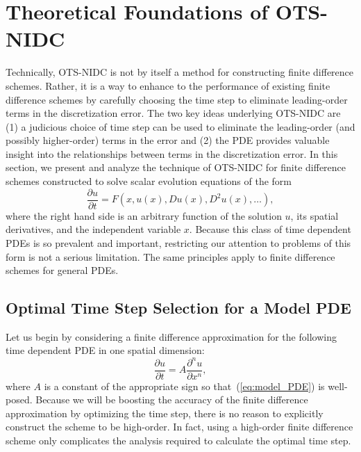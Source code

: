 \documentclass[fleqn,12pt,twoside]{article}
\newcommand{\beq}{\begin{equation}}
\newcommand{\eeq}{\end{equation}}
\begin{document}
\section{\label{sec:OTS-NIDC} Theoretical Foundations of OTS-NIDC}
Technically, OTS-NIDC is not by itself a method for constructing finite
difference schemes.  Rather, it is a way to enhance to the performance of
existing finite difference schemes by carefully choosing the time step to
eliminate leading-order terms in the discretization error.  The two key ideas
underlying OTS-NIDC are 
(1) a judicious choice of time step can be used to eliminate the leading-order 
(and possibly higher-order) terms in the error
and
(2) the PDE provides valuable insight into the relationships between terms
in the discretization error. 
In this section, we present and analyze the technique of OTS-NIDC for
finite difference schemes constructed to solve scalar evolution equations of
the form 
\beq
  \frac{\partial u}{\partial t} = 
    F\left(x, u(x), D u(x), D^2 u(x), \ldots \right), 
\eeq
where the right hand side is an arbitrary function of the solution $u$, its 
spatial derivatives, and the independent variable $x$.
Because this class of time dependent PDEs is so prevalent and important, 
restricting our attention to problems of this form is not a serious 
limitation.  The same principles apply to finite difference schemes for 
general PDEs.


\subsection{\label{sec:ots_model_pde} 
            Optimal Time Step Selection for a Model PDE}
Let us begin by considering a finite difference approximation for the
following time dependent PDE in one spatial dimension: 
\beq
  \frac{\partial u}{\partial t} = A \frac{\partial^n u}{\partial x^n},
  \label{eq:model_PDE}
\eeq
where $A$ is a constant of the appropriate sign so that~(\ref{eq:model_PDE}) 
is well-posed.  Because we will be boosting the accuracy of the finite 
difference approximation by optimizing the time step, there is no reason to 
explicitly construct the scheme to be high-order.  In fact, using a high-order 
finite difference scheme only complicates the analysis required to calculate 
the optimal time step.  
\end{document}
